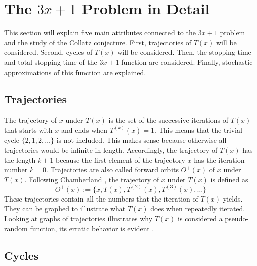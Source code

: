 \documentclass[12pt,a4paper,reqno]{amsart}
\begin{document}

\section{The $3x+1$ Problem in Detail}

This section will explain five main attributes connected to the $3x+1$ problem
and the study of the Collatz conjecture. First, trajectories of $T(x)$ will be
considered. Second, cycles of $T(x)$ will be considered. Then, the stopping
time and total stopping time of the $3x+1$ function are considered. Finally,
stochastic approximations of this function are explained.

\subsection{Trajectories}

The trajectory of $x$ under $T(x)$ is the set of the successive iterations of 
$T(x)$ that starts with $x$ and ends when $T^{(k)}(x)=1$. This means that the
trivial cycle $\{2,1,2,\dots\}$ is not included. This makes sense because
otherwise all trajectories would be infinite in length. Accordingly, the 
trajectory of $T(x)$ has the length $k+1$ because the first element of the 
trajectory $x$ has the iteration number $k=0$. Trajectories are also called 
forward orbits $O^+(x)$ of $x$ under $T(x)$. Following Chamberland
\cite{src:02}, the trajectory of $x$ under $T(x)$ is defined as 
\begin{equation}
    \nonumber
    O^+(x):=\{x, T(x), T^{(2)}(x), T^{(3)}(x),\dots\}
\end{equation}
These trajectories contain all the numbers that the iteration of $T(x)$ yields. 
They can be graphed to illustrate what $T(x)$ does when repeatedly iterated. 
Looking at graphs of trajectories illustrates why $T(x)$ is considered
a pseudo-random function, its erratic behavior is evident \cite{src:03}.

\subsection{Cycles}
\end{document}
